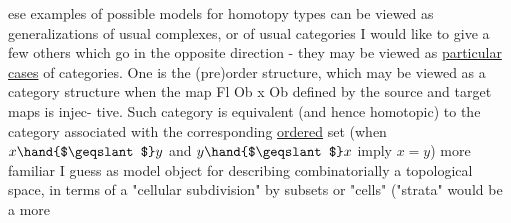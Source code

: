   ese examples of possible models for homotopy types can be viewed
as generalizations of usual complexes,  or of usual categories  I would
like to give a few others which go in the opposite direction  -  they
may be viewed as  \uline{particular cases} of categories.  One is the (pre)order
structure,  which may be viewed as a category structure when the
map    Fl \hand{$\longrightarrow$} Ob x Ob  defined by the source and target maps is injec-%
tive.  Such category is equivalent  (and hence homotopic) to the
category associated with the corresponding \uline{ordered} set (when $x\hand{$\geqslant$} y$ and
$y\hand{$\geqslant$} x$ imply $x=y$)   more familiar I guess as  model object for
describing combinatorially a topological space,  in terms of a "cellular
subdivision"  by  subsets or "cells" ("strata" would be a more
\margin{$\times$}
